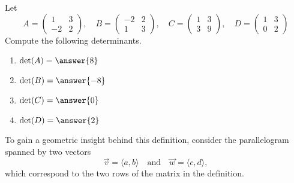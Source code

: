 \documentclass{ximera}
\begin{document}
\begin{question}
  Let
  \[
    A =                         %
    \begin{pmatrix}
      1 & 3 \\ -2 & 2
    \end{pmatrix}, \quad
    B =                         %
    \begin{pmatrix}
      -2 & 2 \\ 1 & 3
    \end{pmatrix}, \quad
    C =                         %
    \begin{pmatrix}
      1 & 3 \\ 3 & 9
    \end{pmatrix}, \quad
    D =                         %
    \begin{pmatrix}
      1 & 3 \\ 0 & 2
    \end{pmatrix}
  \]
  Compute the following determinants.
  \begin{enumerate}
  \item $\det(A) = \answer{8}$
  \item $\det(B) = \answer{-8}$
  \item $\det(C) = \answer{0}$
  \item $\det(D) = \answer{2}$
  \end{enumerate}
\end{question}



To gain a geometric insight behind this definition, consider the
parallelogram spanned by two vectors
\[
  \vec{v} = \langle a, b \rangle
  \quad\text{and}\quad
  \vec{w} = \langle c, d \rangle,
\]
which correspond to the two rows of the matrix in the definition.

\begin{image}
\end{image}
\end{document}
